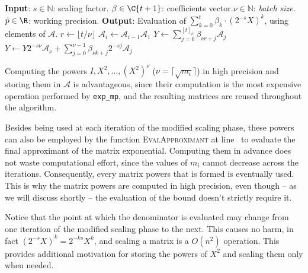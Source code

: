 \begin{algorithm}[htp]
	\caption{\emph{Modified Paterson-Stockmeyer scheme to compute a matrix polynomial at a given precision $\hat{p}$, while producing and storing the matrix powers for subsequent use.}}
	\label{alg:exp_mp_paterson_stockmeyer}
	\begin{algorithmic}[1]
		\Statex\textbf{Input}: $s\in\mathbb{N}$: scaling factor. $\beta\in\C{t+1}$: coefficients vector.\newline $\nu\in\mathbb{N}$: \emph{batch size}. $\hat{p}\in\R$: working precision.
		\Statex\textbf{Output}: Evaluation of $\sum_{k=0}^t\beta_k\cdot(2^{-s}X)^k$, using elements of $\mathcal{A}$.
			\State $r\gets\lfloor t/\nu\rfloor$
			\label{line:add_powers_for_loop}
				\State $\mathcal{A}_i\gets\mathcal{A}_{i-1}\mathcal{A}_{1}$
			\EndFor\label{line:add_powers_for_loop_end}
				\State $Y\gets\sum_{j=0}^{[t]_{\nu}}\beta_{\nu r+j}\mathcal{A}_j$
					\State $Y\gets Y2^{-s\nu}\mathcal{A}_{\nu}+\sum_{j=0}^{\nu-1}\beta_{\nu k+j}2^{-sj}\mathcal{A}_j$
				\EndFor
			\EndWith
		\EndFunction
	\end{algorithmic}
\end{algorithm}

Computing the powers $I, X^2,\dots, (X^2)^{\nu}$ ($\nu=\lceil\sqrt{m_i}\rceil$) in high precision and storing them in $\mathcal{A}$ is advantageous, since their computation is the most expensive operation performed by \texttt{exp\_mp}, and the resulting matrices are reused throughout the algorithm.

Besides being used at each iteration of the modified scaling phase, these powers can also be employed by the function \textsc{EvalApproximant} at line~ to evaluate the final approximant of the matrix exponential. Computing them in advance does not waste computational effort, since the values of $m_i$ cannot decrease across the iterations. Consequently, every matrix powers that is formed is eventually used. This is why the matrix powers are computed in high precision, even though -- as we will discuss shortly -- the evaluation of the bound doesn't strictly require it.

\begin{oss}\label{oss:denominator_eval_point}
	Notice that the point at which the denominator is evaluated may change from one iteration of the modified scaling phase to the next. 
	This causes no harm, in fact $(2^{-s}X)^k=2^{-ks}X^k$, and scaling a matrix is a $O(n^2)$ operation. 
	This provides additional motivation for storing the powers of $X^2$ and scaling them only when needed.
\end{oss}

